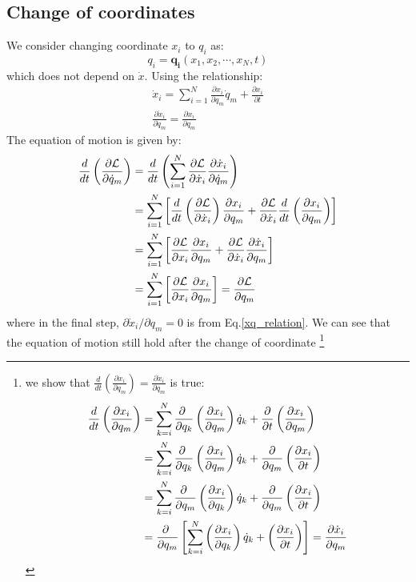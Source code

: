 \documentclass{article}
\newcommand{\pfrac}[2]{\frac{\partial #1}{\partial #2}}
\newcommand{\ddt}[1]{\frac{d}{dt}\left( #1 \right)}
\renewcommand{\L}{\mathcal{L}}
\newcommand{\dotx}{\dot{x}}
\newcommand{\dotq}{\dot{q}}
\begin{document}
\subsection{Change of coordinates}
We consider changing coordinate ${x_i}$ to ${q_i}$ as:
\begin{equation}
    q_i = \mathbf{q_i} (x_1, x_2 , \cdots, x_N, t)
\end{equation}
which does not depend on $\dotx$. Using the relationship:
\begin{gather}
    \dotx_i = \sum_{i=1}^N \pfrac{x_i}{q_m} \dotq_m + \pfrac{x_i}{t} \label{xq_relation}\\
    \pfrac{\dotx_i}{\dotq_m} = \pfrac{x_i}{q_m}
\end{gather}
The equation of motion is
given by:
\begin{align}
    \frac{d}{dt}\left( \frac{\partial \L}{\partial \dotq_m} \right)
    &=  \frac{d}{dt}\left( \sum_{i=1}^N \pfrac{\L}{\dotx_i} \pfrac{\dotx_i}{\dotq_m} \right) \notag \\
    &=  \sum_{i=1}^N \left[ \ddt{\pfrac{\L}{\dotx_i}} \pfrac{x_i}{q_m} + \pfrac{\L}{\dotx_i}\ddt{\pfrac{x_i}{q_m}} \right] \notag \\
    &=  \sum_{i=1}^N \left[ \pfrac{\L}{x_i} \pfrac{x_i}{q_m} + \pfrac{\L}{\dotx_i} \pfrac{\dotx_i}{q_m} \right] \notag \\
    &=  \sum_{i=1}^N \left[ \pfrac{\L}{x_i} \pfrac{x_i}{q_m} \right] = \pfrac{\L}{q_m}
\end{align}
where in the final step, $\partial \dotx_i / \partial q_m = 0$ is from Eq.\ref{xq_relation}. We can see that the 
equation of motion still hold after the change of coordinate
\footnote{
we show that $\ddt{\pfrac{x_i}{q_m}} = \pfrac{\dotx_i}{q_m}$ is true:
\begin{align}
    \ddt{\pfrac{x_i}{q_m}} 
    &= \sum_{k=i}^N \pfrac{\ }{q_k} \left( \pfrac{x_i}{q_m} \right) \dotq_k + \pfrac{}{t} \left( \pfrac{x_i}{q_m} \right) \notag \\
    &= \sum_{k=i}^N \pfrac{\ }{q_k} \left( \pfrac{x_i}{q_m} \right) \dotq_k + \pfrac{}{q_m} \left( \pfrac{x_i}{t} \right) \notag \\
    &= \sum_{k=i}^N \pfrac{\ }{q_m} \left( \pfrac{x_i}{q_k} \right) \dotq_k + \pfrac{}{q_m} \left( \pfrac{x_i}{t} \right) \notag \\
    &= \pfrac{\ }{q_m} \left[ \sum_{k=i}^N  \left( \pfrac{x_i}{q_k} \right) \dotq_k + \left( \pfrac{x_i}{t} \right) \right] = \pfrac{\dotx_i}{q_m}\notag \\
\end{align}
}
\end{document}

